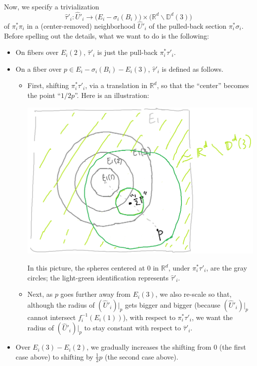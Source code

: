 \documentclass[11pt]{article}
\theoremstyle{definition}
\theoremstyle{remark}
\def\R{\mathbb{R}}
\def\D{\mathbb{D}}
\begin{document}
Now, we specify a trivialization 
$$\hat\tau'_i:\hat{U}'_i\longrightarrow
\big(E_i-\sigma_i(B_i)\big)\times\big(\R^d\backslash\D^d(3)\big)$$
of $\pi_i^*\pi_i$ in a (center-removed) neighborhood $\hat{U}'_i$ of the pulled-back section $\pi_i^*\sigma_i$. Before spelling out the details, what we want to do is the following: 
\begin{itemize}
\item On fibers over $E_i(2)$, $\hat\tau'_i$ is just the pull-back $\pi_i^*\tau'_i$. 
\item On a fiber over $p\in E_i-\sigma_i(B_i)-E_i(3)$, $\hat\tau'_i$ is defined as follows. 
\begin{itemize}
\item First, shifting $\pi_i^*\tau'_i$, via a translation in $\R^d$, so that the ``center'' becomes the point ``$1/2p$''. 
Here is an illustration: 

\includegraphics[scale=0.5]{trivbrak1_fig}

In this picture, the spheres centered at 0 in $\R^d$, under $\pi_i^*\tau'_i$, are the gray circles; the light-green identification represents $\hat\tau'_i$. 
\item Next, as $p$ goes further away from $E_i(3)$, we also re-scale so that, 
although the radius of $(\hat{U}'_i)|_p$ gets bigger and bigger (because $(\hat{U}'_i)|_p$ cannot intersect $f_i^{-1}(E_i(1))$), with respect to $\pi_i^*\tau'_i$, 
we want the radius of $(\hat{U}'_i)|_p$ to stay constant with respect to $\hat\tau'_i$.  
\end{itemize}
\item Over $E_i(3)-E_i(2)$, we gradually increases the shifting from 0 (the first case above) to shifting by $\frac{1}{2}p$ (the second case above). 
\end{itemize}
\end{document}
